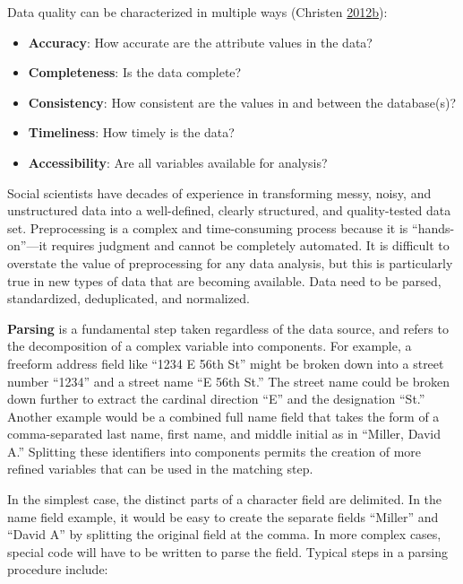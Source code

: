 \documentclass[]{krantz}
\begin{document}
Data quality can be characterized in multiple ways (Christen
\protect\hyperlink{ref-christen2012data}{2012}\protect\hyperlink{ref-christen2012data}{b}):

\begin{itemize}
\item
  \textbf{Accuracy}: How accurate are the attribute values in the data?
\item
  \textbf{Completeness}: Is the data complete?
\item
  \textbf{Consistency}: How consistent are the values in and between the
  database(s)?
\item
  \textbf{Timeliness}: How timely is the data?
\item
  \textbf{Accessibility}: Are all variables available for analysis?
\end{itemize}

Social scientists have decades of experience in transforming messy,
noisy, and unstructured data into a well-defined, clearly structured,
and quality-tested data set. Preprocessing is a complex and
time-consuming process because it is ``hands-on''---it requires judgment
and cannot be completely automated. It is difficult to overstate the
value of preprocessing for any data analysis, but this is particularly
true in new types of data that are becoming available. Data need to be
parsed, standardized, deduplicated, and normalized.

\textbf{Parsing} is a fundamental step taken regardless of the data
source, and refers to the decomposition of a complex variable into
components. For example, a freeform address field like ``1234 E 56th
St'' might be broken down into a street number ``1234'' and a street
name ``E 56th St.'' The street name could be broken down further to
extract the cardinal direction ``E'' and the designation ``St.'' Another
example would be a combined full name field that takes the form of a
comma-separated last name, first name, and middle initial as in
``Miller, David A.'' Splitting these identifiers into components permits
the creation of more refined variables that can be used in the matching
step.

In the simplest case, the distinct parts of a character field are
delimited. In the name field example, it would be easy to create the
separate fields ``Miller'' and ``David A'' by splitting the original
field at the comma. In more complex cases, special code will have to be
written to parse the field. Typical steps in a parsing procedure
include:
\end{document}
